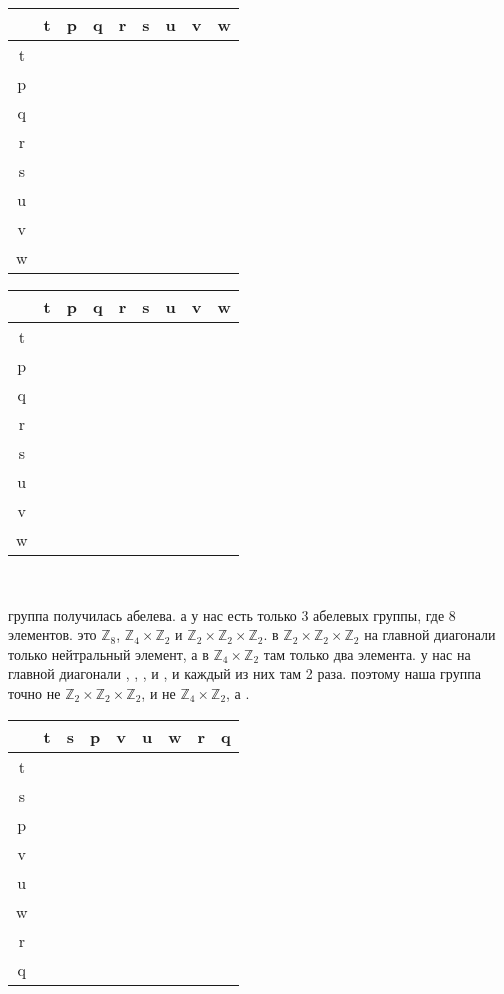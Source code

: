 \documentclass{article}
\newcommand{\Z}{\mathbb{Z}}
\renewcommand{\r}{\right}
\newcommand{\p}{{\color{tablep}{p}}}
\newcommand{\q}{{\color{tableq}{q}}}
\renewcommand{\r}{{\color{tabler}{r}}}
\newcommand{\s}{{\color{tables}{s}}}
\renewcommand{\t}{{\color{tablet}{t}}}
\renewcommand{\u}{{\color{tableu}{u}}}
\renewcommand{\v}{{\color{tablev}{v}}}
\newcommand{\w}{{\color{tablew}{w}}}
\begin{document}
  \begin{tabular}{|c|cccccccc|}
    \hline
     & t & p & q & r & s & u & v & w \\
    \hline
    t&\t &\p &\q &\r &\s &\u &\v &\w \\
    p&\p &\u &\s &\t &\v &\r &\w &\q \\
    q&\q &\s &\r &\w &\t &\v &\p &\u \\
    r&\r &\t &\w &\u &\q &\p &\s &\v \\
    s&\s &\v &\t &\q &\p &\w &\u &\r \\
    u&\u &\r &\v &\p &\w &\t &\q &   \\
    v&\v &\w &\p &\s &\u &\q &\r &\t \\
    w&\w &\q &\u &\v &\r &\s &\t &\p \\
    \hline
  \end{tabular}
  \begin{tabular}{|c|cccccccc|}
    \hline
     & t & p & q & r & s & u & v & w \\
    \hline
    t&\t &\p &\q &\r &\s &\u &\v &\w \\
    p&\p &\u &\s &\t &\v &\r &\w &\q \\
    q&\q &\s &\r &\w &\t &\v &\p &\u \\
    r&\r &\t &\w &\u &\q &\p &\s &\v \\
    s&\s &\v &\t &\q &\p &\w &\u &\r \\
    u&\u &\r &\v &\p &\w &\t &\q &\s \\
    v&\v &\w &\p &\s &\u &\q &\r &\t \\
    w&\w &\q &\u &\v &\r &\s &\t &\p \\
    \hline
  \end{tabular} \\
  \par\noindent
  группа получилась абелева. а у нас есть только 3 абелевых группы, где 8 элементов.
  это $\Z_8$, $\Z_4\times\Z_2$ и $\Z_2\times\Z_2\times\Z_2$.
  в $\Z_2\times\Z_2\times\Z_2$ на главной диагонали только нейтральный элемент, а в $\Z_4\times\Z_2$ там только два элемента.
  у нас на главной диагонали \t{}, \r{}, \u{}, и \p{}, и каждый из них там 2 раза.
  поэтому наша группа точно не $\Z_2\times\Z_2\times\Z_2$, и не $\Z_4\times\Z_2$, а \fbox{$\Z_8$}.

  \begin{center}
    \begin{tabular}{|c|cccccccc|}
      \hline
       & t & s & p & v & u & w & r & q \\
      \hline
      t&\t &\s &\p &\v &\u &\w &\r &\q \\
      s&\s &\p &\v &\u &\w &\r &\q &\t \\
      p&\p &\v &\u &\w &\r &\q &\t &\s \\
      v&\v &\u &\w &\r &\q &\t &\s &\p \\
      u&\u &\w &\r &\q &\t &\s &\p &\v \\
      w&\w &\r &\q &\t &\s &\p &\v &\u \\
      r&\r &\q &\t &\s &\p &\v &\u &\w \\
      q&\q &\t &\s &\p &\v &\u &\w &\r \\
      \hline
    \end{tabular}
  \end{center}
\end{document}
